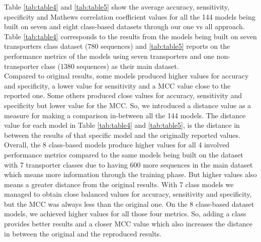 
        Table \ref{tab:table4} and \ref{tab:table5} show the average accuracy, sensitivity, specificity and 
        Mathews correlation coefficient values for all the 144 models being built on seven and eight class-based datasets 
        through our one vs all approach. Table \ref{tab:table4} corresponds to the results from the models being built on 
        seven transporters class dataset (780 sequences) and \ref{tab:table5} reports on the performance metrics of 
        the models using seven transporters and one non-transporter class (1380 sequences) as their main dataset.\\

        Compared to original results, some models produced higher values for accuracy and specificity, a lower value for 
        sensitivity and a MCC value close to the reported one. Some others produced close values for accuracy, sensitivity 
        and specificity but lower value for the MCC. So, we introduced a distance value as a measure for making a comparison 
        in-between all the 144 models. The distance value for each model in Table \ref{tab:table4} and \ref{tab:table5}, 
        is the distance in between the results of that specific model and the originally reported values.\\
        
        Overall, the 8 class-based models produce higher values for all 4 involved performance metrics compared to the same models 
        being built on the dataset with 7 transporter classes due to having 600 more sequences in the main dataset which means more 
        information through the training phase. But higher values also means a greater distance from the original results. 
        With 7 class models we managed to obtain close balanced values for accuracy, sensitivity and specificity, 
        but the MCC was always less than the original one. On the 8 class-based dataset models, we achieved higher values for 
        all those four metrics. So, adding a class provides better results and a closer MCC value which also increases the distance 
        in between the original and the reproduced results.\\
        
